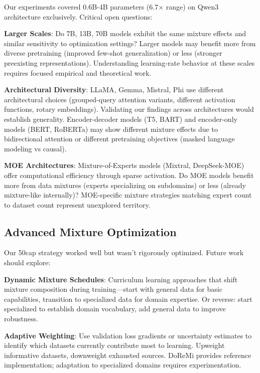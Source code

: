 Our experiments covered 0.6B-4B parameters (6.7$\times$ range) on Qwen3 architecture exclusively. Critical open questions:

\textbf{Larger Scales}: Do 7B, 13B, 70B models exhibit the same mixture effects and similar sensitivity to optimization settings? Larger models may benefit more from diverse pretraining (improved few-shot generalization) or less (stronger preexisting representations). Understanding learning-rate behavior at these scales requires focused empirical and theoretical work.

\textbf{Architectural Diversity}: LLaMA, Gemma, Mistral, Phi use different architectural choices (grouped-query attention variants, different activation functions, rotary embeddings). Validating our findings across architectures would establish generality. Encoder-decoder models (T5, BART) and encoder-only models (BERT, RoBERTa) may show different mixture effects due to bidirectional attention or different pretraining objectives (masked language modeling vs causal).

\textbf{MOE Architectures}: Mixture-of-Experts models (Mixtral, DeepSeek-MOE) offer computational efficiency through sparse activation. Do MOE models benefit more from data mixtures (experts specializing on subdomains) or less (already mixture-like internally)? MOE-specific mixture strategies matching expert count to dataset count represent unexplored territory.

\subsection{Advanced Mixture Optimization}

Our 50cap strategy worked well but wasn't rigorously optimized. Future work should explore:

\textbf{Dynamic Mixture Schedules}: Curriculum learning approaches that shift mixture composition during training—start with general data for basic capabilities, transition to specialized data for domain expertise. Or reverse: start specialized to establish domain vocabulary, add general data to improve robustness.

\textbf{Adaptive Weighting}: Use validation loss gradients or uncertainty estimates to identify which datasets currently contribute most to learning. Upweight informative datasets, downweight exhausted sources. DoReMi \parencite{xie2023doremi} provides reference implementation; adaptation to specialized domains requires experimentation.

